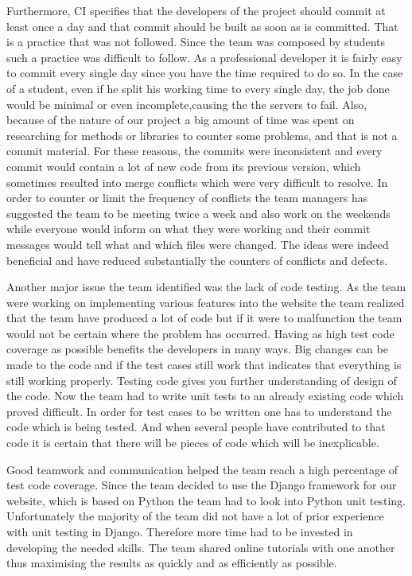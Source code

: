 \documentclass{l3proj}
\begin{document}
Furthermore, CI specifies that the developers of the project should commit at least once a day and that commit should be built as soon as is committed. That is a practice that was not followed. Since the team was composed by students such a practice was difficult to follow. As a professional developer it is fairly easy to commit every single day since you have the time required to do so. In the case of a student, even if he split his working time to every single day, the job done would be minimal or even incomplete,causing the the servers to fail. Also, because of the nature of our project a big amount of time was spent on researching for methods or libraries to counter some problems, and that is not a commit material. For these reasons, the commits were inconsistent and every commit would contain a lot of new code from its previous version, which sometimes resulted into merge conflicts which were very difficult to resolve. In order to counter or limit the frequency of conflicts the team managers has suggested the team to be meeting twice a week and also work on the weekends while everyone would inform on what they were working and their commit messages would tell what and which files were changed. The ideas were indeed beneficial and have reduced substantially the counters of conflicts and defects.

Another major issue the team identified was the lack of code testing. As the team were working on implementing various features into the website the team realized that the team have produced a lot of code but if it were to malfunction the team would not be certain where the problem has occurred. Having as high test code coverage as possible benefits the developers in many ways. Big changes can be made to the code and if the test cases still work that indicates that everything is still working properly. Testing code gives you further understanding of design of the code. Now the team had to write unit tests to an already existing code which proved difficult. In order for test cases to be written one has to understand the code which is being tested. And when several people have contributed to that code it is certain that there will be pieces of code which will be inexplicable.

Good teamwork and communication helped the team reach a high percentage of test code coverage. Since the team decided to use the Django framework for our website, which is based on Python the team had to look into Python unit testing. Unfortunately the majority of the team did not have a lot of prior experience with unit testing in Django. Therefore more time had to be invested in developing the needed skills. The team shared online tutorials with one another thus maximising the results as quickly and as efficiently as possible.
\end{document}
